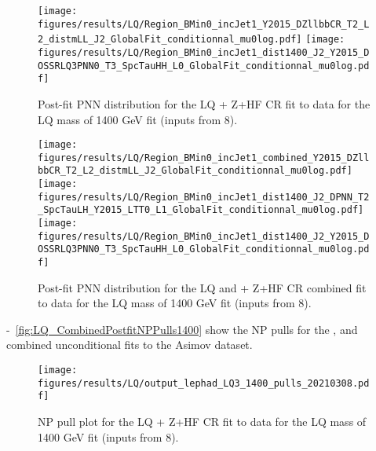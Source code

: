 \begin{figure}
\centering
\texttt{[image: figures/results/LQ/Region\_BMin0\_incJet1\_Y2015\_DZllbbCR\_T2\_L2\_distmLL\_J2\_GlobalFit\_conditionnal\_mu0log.pdf]}
\texttt{[image: figures/results/LQ/Region\_BMin0\_incJet1\_dist1400\_J2\_Y2015\_DOSSRLQ3PNN0\_T3\_SpcTauHH\_L0\_GlobalFit\_conditionnal\_mu0log.pdf]}
\caption{Post-fit PNN distribution for the LQ \hadhad + Z+HF CR fit to data for the LQ mass of 1400 GeV fit (inputs from 8).}
\label{fig:LQ_HadHadPostfitPNNScoreDistributions}
\end{figure}

\begin{figure}
\centering
\texttt{[image: figures/results/LQ/Region\_BMin0\_incJet1\_combined\_Y2015\_DZllbbCR\_T2\_L2\_distmLL\_J2\_GlobalFit\_conditionnal\_mu0log.pdf]}
\texttt{[image: figures/results/LQ/Region\_BMin0\_incJet1\_dist1400\_J2\_DPNN\_T2\_SpcTauLH\_Y2015\_LTT0\_L1\_GlobalFit\_conditionnal\_mu0log.pdf]}
\texttt{[image: figures/results/LQ/Region\_BMin0\_incJet1\_dist1400\_J2\_Y2015\_DOSSRLQ3PNN0\_T3\_SpcTauHH\_L0\_GlobalFit\_conditionnal\_mu0log.pdf]}
\caption{Post-fit PNN distribution for the LQ \lephad and \hadhad + Z+HF CR combined fit to data for the LQ mass of 
1400 GeV fit (inputs from 8).}
\label{fig:LQ_CombinedPostfitPNNScoreDistributions}
\end{figure}


 -~\ref{fig:LQ_CombinedPostfitNPPulls1400} show the NP pulls for the \lephad, \hadhad and combined unconditional fits to the Asimov dataset. %

\begin{figure}
\centering
\texttt{[image: figures/results/LQ/output\_lephad\_LQ3\_1400\_pulls\_20210308.pdf]}
\caption{NP pull plot for the LQ \lephad + Z+HF CR fit to data for the LQ mass of 1400 GeV fit (inputs from 8).}
\label{fig:LQ_LepHadPostfitNPPulls1400}
\end{figure}

